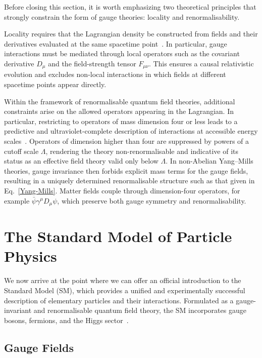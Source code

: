 Before closing this section, it is worth emphasizing two theoretical principles that strongly constrain the form of gauge theories: locality and renormalisability.

Locality requires that the Lagrangian density be constructed from fields and their derivatives evaluated at the same spacetime point~\cite{WeinbergQFT}.
In particular, gauge interactions must be mediated through local operators such as the covariant derivative $D_\mu$ and the field-strength tensor $F_{\mu\nu}$.
This ensures a causal relativistic evolution and excludes non-local interactions in which fields at different spacetime points appear directly.

Within the framework of renormalisable quantum field theories, additional constraints arise on the allowed operators appearing in the Lagrangian.
In particular, restricting to operators of mass dimension four or less leads to a predictive and ultraviolet-complete description of interactions at accessible energy scales~\cite{tHooft1971}.
Operators of dimension higher than four are suppressed by powers of a cutoff scale $\Lambda$, rendering the theory non-renormalisable and indicative of its status as an effective field theory valid only below $\Lambda$.
In non-Abelian Yang--Mills theories, gauge invariance then forbids explicit mass terms for the gauge fields, resulting in a uniquely determined renormalisable structure such as that given in Eq.~\eqref{Yang-Mills}.
Matter fields couple through dimension-four operators, for example $\bar{\psi}\gamma^\mu D_\mu\psi$, which preserve both gauge symmetry and renormalisability.

\section{The Standard Model of Particle Physics}\label{sec:SM}

We now arrive at the point where we can offer an official introduction to the Standard Model (SM),
which provides a unified and experimentally successful description of elementary particles and their interactions.
Formulated as a gauge-invariant and renormalisable quantum field theory, the SM incorporates gauge bosons, fermions, and the Higgs sector~\cite{Glashow1961,Weinberg1967,Salam1968,GIM1970,BuchmullerLudeling2006SM}.

\subsection{Gauge Fields}\label{subsec:bosons}

